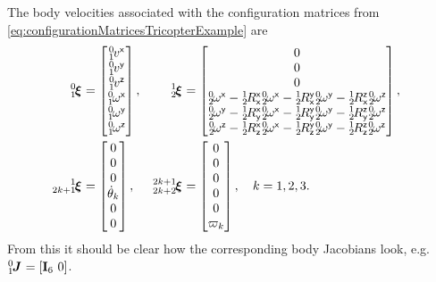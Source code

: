 \begin{Example}
The body velocities associated with the configuration matrices from \eqref{eq:configurationMatricesTricopterExample} are
\begin{subequations}
\begin{align}
 \bodyVel{0}{1} &= \begin{bmatrix} \bodyLinVelx{0}{1} \\ \bodyLinVely{0}{1} \\ \bodyLinVelz{0}{1} \\ \bodyAngVelx{0}{1} \\ \bodyAngVely{0}{1} \\ \bodyAngVelz{0}{1} \end{bmatrix},&
 \bodyVel{1}{2} &= 
 \begin{bmatrix}
  0 \\ 0 \\ 0 \\
  \bodyAngVelx{0}{2} - \bodyRotxx{1}{2} \bodyAngVelx{0}{2} - \bodyRotyx{1}{2} \bodyAngVely{0}{2} - \bodyRotzx{1}{2} \bodyAngVelz{0}{2} \\
  \bodyAngVely{0}{2} - \bodyRotxy{1}{2} \bodyAngVelx{0}{2} - \bodyRotyy{1}{2} \bodyAngVely{0}{2} - \bodyRotzy{1}{2} \bodyAngVelz{0}{2} \\
  \bodyAngVelz{0}{2} - \bodyRotxz{1}{2} \bodyAngVelx{0}{2} - \bodyRotyz{1}{2} \bodyAngVely{0}{2} - \bodyRotzz{1}{2} \bodyAngVelz{0}{2} 
 \end{bmatrix},&
\\
 \bodyVel{1}{2k+1} &= \begin{bmatrix} 0 \\ 0 \\ 0 \\ \aServod[k] \\ 0 \\ 0 \end{bmatrix},&
 \bodyVel{2k+1}{2k+2} &= \begin{bmatrix} 0 \\ 0 \\ 0 \\ 0 \\ 0 \\ \PropVel[k] \end{bmatrix},
\quad k=1,2,3.
\end{align}
\end{subequations}
From this it should be clear how the corresponding body Jacobians look, e.g.\ $\bodyJac{0}{1} = [\idMat[6] \ 0]$.


\end{Example}
